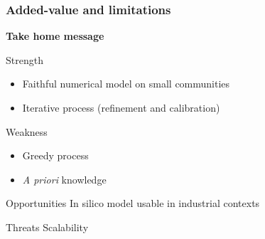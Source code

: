 \documentclass[8pt,usenames,dvipsnames]{beamer}
\begin{document}
\begin{frame}
\frametitle{Added-value and limitations}
\centering
\textbf{\huge Take home message}

\begin{minipage}{0.45\textwidth}
\vspace{0.3cm}
\begin{block}{Strength}
\begin{itemize}
\item Faithful numerical model on small communities %
\item Iterative process (refinement and calibration)
\end{itemize}
\end{block} %
\end{minipage}\hfill
\hspace{0.5cm}
\hfill
\begin{minipage}{0.45\textwidth}
\begin{block}{Weakness}
\begin{itemize}
\item Greedy process
\item \textit{A priori} knowledge
\end{itemize}
\end{block}
\end{minipage}


\begin{minipage}{0.45\textwidth}
\begin{block}{Opportunities}
In silico model usable in industrial contexts
\end{block} %
\end{minipage}\hfill
\hspace{0.5cm}
\hfill
\begin{minipage}{0.45\textwidth}
\begin{block}{Threats}
Scalability
\end{block}
\end{minipage}


\end{frame}
\end{document}

